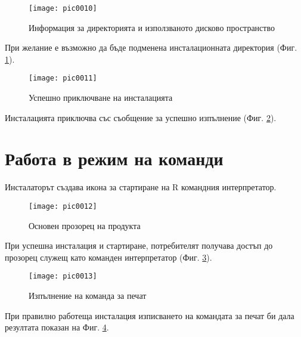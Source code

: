 \begin{figure}[h]
  \centering
  \texttt{[image: pic0010]}
  \caption{Информация за директорията и използваното дисково пространство}
\label{fig:pic0010}
\end{figure}
\FloatBarrier

При желание е възможно да бъде подменена инсталационната директория (Фиг. \ref{fig:pic0010}).

\begin{figure}[h]
  \centering
  \texttt{[image: pic0011]}
  \caption{Успешно приключване на инсталацията}
\label{fig:pic0011}
\end{figure}
\FloatBarrier

Инсталацията приключва със съобщение за успешно изпълнение (Фиг. \ref{fig:pic0011}).

\section{Работа в режим на команди}

Инсталаторът създава икона за стартиране на R командния интерпретатор.

\begin{figure}[h]
  \centering
  \texttt{[image: pic0012]}
  \caption{Основен прозорец на продукта}
\label{fig:pic0012}
\end{figure}
\FloatBarrier

При успешна инсталация и стартиране, потребителят получава достъп до прозорец служещ като команден интерпретатор (Фиг. \ref{fig:pic0012}).

\begin{figure}[h]
  \centering
  \texttt{[image: pic0013]}
  \caption{Изпълнение на команда за печат}
\label{fig:pic0013}
\end{figure}
\FloatBarrier

При правилно работеща инсталация изписването на командата за печат би дала резултата показан на Фиг. \ref{fig:pic0013}.